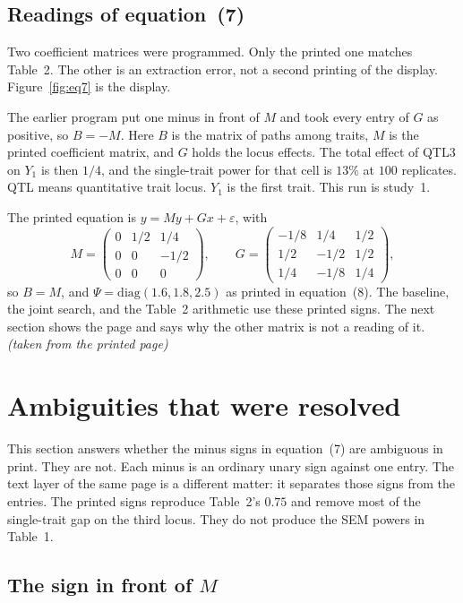 \documentclass[11pt]{article}
\newcommand{\ev}[1]{\textup{\emph{(#1)}}}
\begin{document}
\subsection{Readings of equation~(7)}

Two coefficient matrices were programmed. Only the printed one matches
Table~2. The other is an extraction error, not a second printing of the
display. Figure~\ref{fig:eq7} is the display.

The earlier program put one minus in front of $M$ and took every entry of
$G$ as positive, so $B=-M$. Here $B$ is the matrix of paths among traits,
$M$ is the printed coefficient matrix, and $G$ holds the locus effects.
The total effect of QTL3 on $Y_1$ is then $1/4$, and the single-trait power
for that cell is $13\%$ at $100$ replicates. QTL means quantitative trait
locus. $Y_1$ is the first trait. This run is study~1.

The printed equation is $y=My+Gx+\varepsilon$, with
\[
M=\begin{pmatrix}0&1/2&1/4\\0&0&-1/2\\0&0&0\end{pmatrix},\qquad
G=\begin{pmatrix}-1/8&1/4&1/2\\1/2&-1/2&1/2\\1/4&-1/8&1/4\end{pmatrix},
\]
so $B=M$, and $\Psi=\mathrm{diag}(1.6,1.8,2.5)$ as printed in equation~(8).
The baseline, the joint search, and the Table~2 arithmetic use these
printed signs. The next section shows the page and says why the other
matrix is not a reading of it.
\ev{taken from the printed page}

\section{Ambiguities that were resolved}
\label{sec:resolved}

This section answers whether the minus signs in equation~(7) are ambiguous
in print. They are not. Each minus is an ordinary unary sign against one
entry. The text layer of the same page is a different matter: it separates
those signs from the entries. The printed signs reproduce Table~2's $0.75$
and remove most of the single-trait gap on the third locus. They do not
produce the SEM powers in Table~1.

\subsection{The sign in front of \(M\)}
\end{document}
